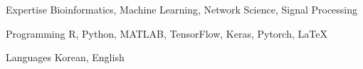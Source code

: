 

\begin{cvskills}



  \cvskill
    {Expertise} %
    {Bioinformatics, Machine Learning, Network Science, Signal Processing} %

  \cvskill
    {Programming} %
    {R, Python, MATLAB, TensorFlow, Keras, Pytorch, LaTeX} %

  \cvskill
    {Languages} %
    {Korean, English} %

\end{cvskills}

